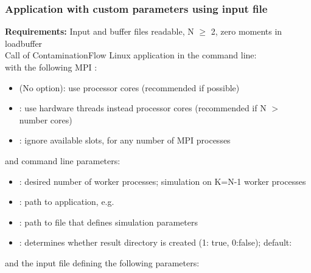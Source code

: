 \subsubsection{Application with custom parameters using input file}
\textbf{Requirements:} Input and buffer files readable, N $\geq$ 2, zero moments in loadbuffer\\[4pt]
Call of ContaminationFlow Linux application in the command line:
\leavevmode\\[-8pt]
with the following MPI :
\begin{itemize}[noitemsep,topsep=0pt, partopsep=0pt]
\item  (No option): use processor cores (recommended if possible)
\item {}: use hardware threads instead processor cores (recommended if N $>$ number cores)
\item {}: ignore available slots, for any number of MPI processes
\end{itemize}
\bigskip
and command line parameters:
\begin{itemize}[noitemsep,topsep=0pt, partopsep=0pt]
\item {}: desired number of worker processes; simulation on K=N-1 worker processes
\item {}: path to application, e.g.\ 
\item {}: path to file that defines simulation parameters
\item {}: determines whether result directory is created (1: true, 0:false); default:
\end{itemize}
\bigskip
and the input file defining the following parameters:
